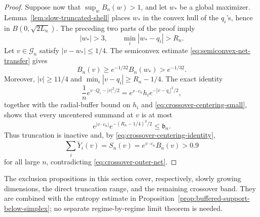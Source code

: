 \begin{proof}
Suppose now that \(\sup_wB_n(w)>1\), and let \(w_*\) be a global
maximizer.  Lemma~\ref{lem:slow-truncated-shell} places \(w_*\) in the
convex hull of the \(q_i\)'s, hence in \(B(0,\sqrt{2L_n})\).  The preceding
two parts of the proof imply
\[
 |w_*|>3,\qquad \min_i|w_*-q_i|>R_n.
\]
Let \(v\in\mathcal G_n\) satisfy \(|v-w_*|\le1/4\).  The semiconvex
estimate \eqref{eq:semiconvex-net-transfer} gives
\[
 B_n(v)\ge e^{-1/32}B_n(w_*)>e^{-1/32}.
\]
Moreover, \(|v|\ge11/4\) and
\(\min_i|v-q_i|\ge R_n-1/4\).  The exact identity
\[
 \frac1n e^{v\cdot Q_i-|v|^2/2}
 =e^{v\cdot c_n}h_i e^{-|v-q_i|^2/2},
\]
together with the radial-buffer bound on \(h_i\) and
\eqref{eq:crossover-centering-small}, shows that every uncentered summand
at \(v\) is at most
\[
 e^{|v\cdot c_n|}e^{-(R_n-1/4)^2/2}
 \le \mathfrak b_n.
\]
Thus truncation is inactive and, by
\eqref{eq:crossover-centering-identity},
\[
 \sum_i\widetilde Y_i(v)=S_n(v)
 =e^{v\cdot c_n}B_n(v)>0.9
\]
for all large \(n\), contradicting \eqref{eq:crossover-outer-net}.
\end{proof}

The exclusion propositions in this section cover, respectively, slowly
growing dimensions, the direct truncation range, and the remaining
crossover band. They are combined with the entropy estimate in
Proposition~\ref{prop:buffered-support-below-simplex}; no separate
regime-by-regime limit theorem is needed.
